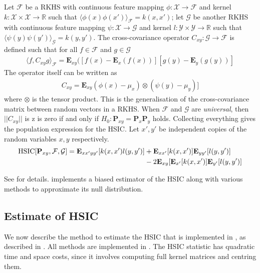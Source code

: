 Let $\mathcal{F}$ be a RKHS with continuous feature mapping $\phi:\mathcal{X}\rightarrow\mathcal{F}$ and kernel $k:\mathcal{X}\times\mathcal{X}\rightarrow\mathbb{R}$ such that $\langle \phi(x)\phi(x')\rangle_\mathcal{F}=k(x,x')$; let $\mathcal{G}$ be another RKHS with continuous feature mapping $\psi:\mathcal{X}\rightarrow\mathcal{G}$ and kernel $l:\mathcal{Y}\times\mathcal{Y}\rightarrow\mathbb{R}$ such that $\langle \psi(y)\psi(y')\rangle_\mathcal{G}=k(y,y')$. The cross-covariance operator $C_{xy}:\mathcal{G}\rightarrow\mathcal{F}$ is defined such that for all $f\in\mathcal{F}$ and $g\in\mathcal{G}$
\begin{align*}
\langle f,C_{xy}g \rangle_\mathcal{F}=\textbf{E}_{xy}([f(x)-\textbf{E}_x(f(x))][g(y)-\textbf{E}_y (g(y))]
\end{align*}
The operator itself can be written as
\begin{align*}
C_{xy}=\textbf{E}_{xy}(\phi(x)-\mu_x) \otimes
 (\psi(y) - \mu_y)]
\end{align*}
where $\otimes$ is the tensor product. This is the generalisation of the cross-covariance matrix between random vectors in a RKHS. When $\mathcal{F}$ and $\mathcal{G}$ are \emph{universal}, then $||C_{xy}||$ is z is zero if and only if $H_0:\textbf{P}_{xy}=\textbf{P}_x \textbf{P}_y$ holds. Collecting everything gives the population expression for the HSIC. Let $x', y'$ be independent copies of the random variables $x,y$ respectively.
\begin{align}
\label{eqn:hsic_population}
\operatorname{HSIC}[\textbf{P}_{xy},\mathcal{F},\mathcal{G}]=\textbf{E}_{xx'yy'}[k(x,x')l(y,y')] &+ \textbf{E}_{xx'}[k(x,x')]\textbf{E}_{yy'}[l(y,y')]\\
&-2\textbf{E}_{xy}[\textbf{E}_{x'}[k(x,x')]\textbf{E}_{y'}[l(y,y')]\notag
\end{align}

See \citep{Gretton2008d} for details. \shogun{} implements a biased estimator of the HSIC along with various methods to approximate its null distribution.

\subsection{Estimate of HSIC}
We now describe the method to estimate the HSIC that is implemented in \shogun{}, as described in \citep[Equation 4]{Gretton2008d}. All methods are implemented in . The HSIC statistic has quadratic time and space costs, since it involves computing full kernel matrices and centring them.

